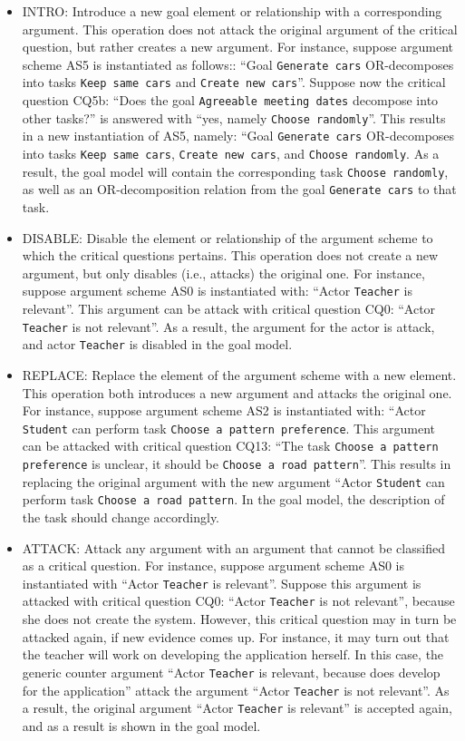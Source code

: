 \begin{itemize}
\item \textsf{INTRO}: Introduce a new goal element or relationship with a corresponding argument. This operation does not attack the original argument of the critical question, but rather creates a new argument. For instance, suppose argument scheme AS5 is instantiated as follows:: ``Goal \texttt{Generate cars} OR-decomposes into tasks \texttt{Keep same cars} and \texttt{Create new cars}''. Suppose now the critical question CQ5b: ``Does the goal \texttt{Agreeable meeting dates} decompose into other tasks?'' is answered with ``yes, namely \texttt{Choose randomly}''. This results in a new instantiation of AS5, namely: ``Goal \texttt{Generate cars} OR-decomposes into tasks \texttt{Keep same cars}, \texttt{Create new cars}, and \texttt{Choose randomly}. As a result, the goal model will contain the corresponding task \texttt{Choose randomly}, as well as an OR-decomposition relation from the goal \texttt{Generate cars} to that task.
\item \textsf{DISABLE:} Disable the element or relationship of the argument scheme to which the critical questions pertains. This operation does not create a new argument, but only disables (i.e., attacks) the original one. For instance, suppose argument scheme AS0 is instantiated with: ``Actor \texttt{Teacher} is relevant''. This argument can be attack with critical question CQ0: ``Actor \texttt{Teacher} is not relevant''. As a result, the argument for the actor is attack, and actor \texttt{Teacher} is disabled in the goal model.
\item \textsf{REPLACE:} Replace the element of the argument scheme with a new element. This operation both introduces a new argument and attacks the original one. For instance, suppose argument scheme AS2 is instantiated with: ``Actor \texttt{Student} can perform task \texttt{Choose a pattern preference}. This argument can be attacked with critical question CQ13: ``The task \texttt{Choose a pattern preference} is unclear, it should be \texttt{Choose a road pattern}''. This results in replacing the original argument with the new argument ``Actor \texttt{Student} can perform task \texttt{Choose a road pattern}. In the goal model, the description of the task should change accordingly.
\item \textsf{ATTACK:} Attack any argument with an argument that cannot be classified as a critical question. For instance, suppose argument scheme AS0 is instantiated with ``Actor \texttt{Teacher} is relevant''. Suppose this argument is attacked with critical question CQ0: ``Actor \texttt{Teacher} is not relevant'', because she does not create the system. However, this critical question may in turn be attacked again, if new evidence comes up. For instance, it may turn out that the teacher will work on developing the application herself. In this case, the generic counter argument ``Actor \texttt{Teacher} is relevant, because does develop for the application'' attack the argument ``Actor \texttt{Teacher} is not relevant''. As a result, the original argument ``Actor \texttt{Teacher} is relevant'' is accepted again, and as a result is shown in the goal model.
\end{itemize}

